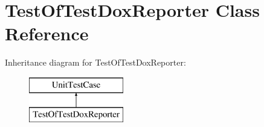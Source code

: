 \hypertarget{class_test_of_test_dox_reporter}{
\section{TestOfTestDoxReporter Class Reference}
\label{class_test_of_test_dox_reporter}
}
Inheritance diagram for TestOfTestDoxReporter:\begin{figure}[H]
\begin{center}
\leavevmode
\includegraphics[height=2.000000cm]{class_test_of_test_dox_reporter}
\end{center}
\end{figure}
